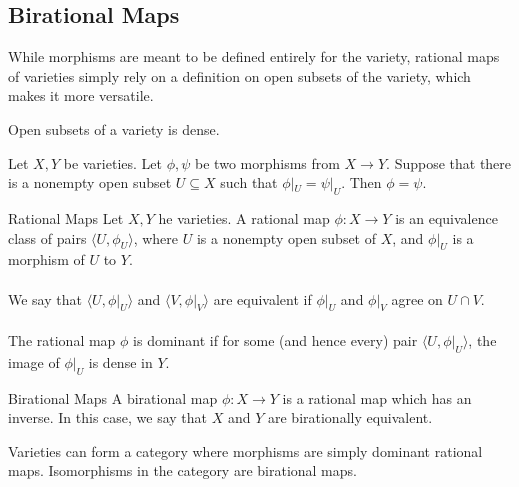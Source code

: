 \documentclass[a4paper]{article}
\begin{document}
\subsection{Birational Maps}
While morphisms are meant to be defined entirely for the variety, rational maps of varieties simply rely on a definition on open subsets of the variety, which makes it more versatile. 

\begin{lmm}{}{} Open subsets of a variety is dense. 
\end{lmm}

\begin{lmm}{}{} Let $X,Y$ be varieties. Let $\phi,\psi$ be two morphisms from $X\to Y$. Suppose that there is a nonempty open subset $U\subseteq X$ such that $\phi|_U=\psi|_U$. Then $\phi=\psi$. 
\end{lmm}

\begin{defn}{Rational Maps}{} Let $X,Y$ he varieties. A rational map $\phi:X\to Y$ is an equivalence class of pairs $\langle U,\phi_U\rangle$, where $U$ is a nonempty open subset of $X$, and $\phi|_U$ is a morphism of $U$ to $Y$. \\~\\
We say that $\langle U,\phi|_U\rangle$ and $\langle V,\phi|_V\rangle$ are equivalent if $\phi|_U$ and $\phi|_V$ agree on $U\cap V$. \\~\\
The rational map $\phi$ is dominant if for some (and hence every) pair $\langle U,\phi|_U\rangle$, the image of $\phi|_U$ is dense in $Y$. 
\end{defn}

\begin{defn}{Birational Maps}{} A birational map $\phi:X\to Y$ is a rational map which has an inverse. In this case, we say that $X$ and $Y$ are birationally equivalent. 
\end{defn}

Varieties can form a category where morphisms are simply dominant rational maps. Isomorphisms in the category are birational maps. 
\end{document}
